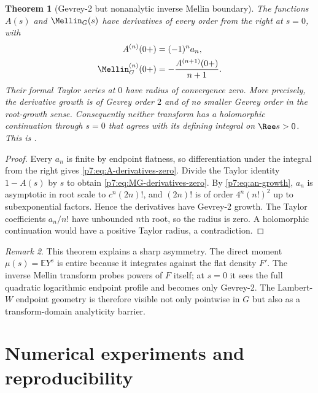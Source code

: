 \documentclass[11pt,oneside]{article}
\newtheorem{theorem}{Theorem}[section]
\theoremstyle{definition}
\theoremstyle{remark}
\newtheorem{remark}[theorem]{Remark}
\newcommand{\E}{\mathbb E}
\newcommand{\1}{\mathbf 1}
\begin{document}
\begin{theorem}[Gevrey-2 but nonanalytic inverse Mellin boundary]
\label{p7:thm:Gevrey-barrier}
The functions $A(s)$ and $\Mellin_G(s)$ have derivatives of every order from the right at
$s=0$, with
\begin{align}
 A^{(n)}(0+)&=(-1)^na_n,\label{p7:eq:A-derivatives-zero}\\
 \Mellin_G^{(n)}(0+)&=-\frac{A^{(n+1)}(0+)}{n+1}.
 \label{p7:eq:MG-derivatives-zero}
\end{align}
Their formal Taylor series at $0$ have radius of convergence zero.  More precisely, the
derivative growth is of Gevrey order $2$ and of no smaller Gevrey order in the root-growth
sense.  Consequently neither transform has a holomorphic continuation through $s=0$ that
agrees with its defining integral on $\Ree s>0$.  This is \statusderived.
\end{theorem}

\begin{proof}
Every $a_n$ is finite by endpoint flatness, so differentiation under the integral from the
right gives \cref{p7:eq:A-derivatives-zero}.  Divide the Taylor identity
$1-A(s)$ by $s$ to obtain \cref{p7:eq:MG-derivatives-zero}.  By
\cref{p7:eq:an-growth}, $a_n$ is asymptotic in root scale to
$c^n(2n)!$, and $(2n)!$ is of order $4^n(n!)^2$ up to subexponential factors.  Hence the
derivatives have Gevrey-2 growth.  The Taylor coefficients $a_n/n!$ have unbounded $n$th
root, so the radius is zero.  A holomorphic continuation would have a positive Taylor radius,
a contradiction.
\end{proof}

\begin{remark}
This theorem explains a sharp asymmetry.  The direct moment $\mu(s)=\E Y^s$ is entire because
it integrates against the flat density $F'$.  The inverse Mellin transform probes powers of
$F$ itself; at $s=0$ it sees the full quadratic logarithmic endpoint profile and becomes only
Gevrey-2.  The Lambert-$W$ endpoint geometry is therefore visible not only pointwise in $G$
but also as a transform-domain analyticity barrier.
\end{remark}

\section{Numerical experiments and reproducibility}
\label{p7:sec:numerics}
\end{document}
